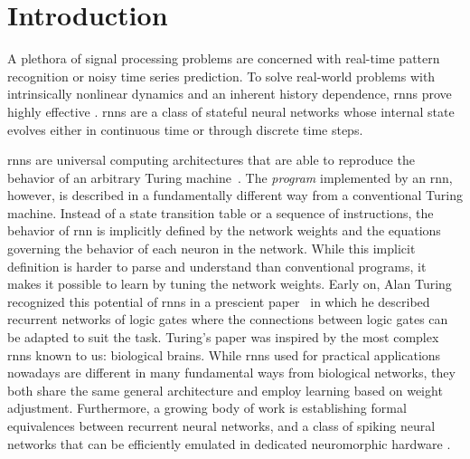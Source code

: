 \documentclass[journal,onecolumn,11pt]{IEEEtran}
\begin{document}
\section{Introduction}
A plethora of signal processing problems are concerned with real-time pattern recognition or noisy time series prediction.
To solve real-world problems with intrinsically nonlinear dynamics and an inherent history dependence, \glspl{rnn} prove highly effective \cite{Goodfellow_etal16_deeplear}. 
\glspl{rnn} are a class of stateful neural networks whose internal state evolves either in continuous time or through discrete time steps.

\glspl{rnn} are universal computing architectures that are able to reproduce the behavior of an arbitrary Turing machine~\cite{Siegelmann_Sontag95}.
The {\it program} implemented by an \gls{rnn}, however, is described in a fundamentally different way from a conventional Turing machine.
Instead of a state transition table or a sequence of instructions, the behavior of \gls{rnn} is implicitly defined by the network weights and the equations governing the behavior of each neuron in the network.
While this implicit definition is harder to parse and understand than conventional programs, it makes it possible to learn by tuning the network weights.
Early on, Alan Turing recognized this potential of \glspl{rnn} in a prescient paper~\cite{Ince92} in which he described recurrent networks of logic gates where the connections between logic gates can be adapted to suit the task.
Turing's paper was inspired by the most complex \glspl{rnn} known to us: biological brains.
While \glspl{rnn} used for practical applications nowadays are different in many fundamental ways from biological networks, they both share the same general architecture and employ learning based on weight adjustment.
Furthermore, a growing body of work is establishing formal equivalences between recurrent neural networks, and a class of spiking neural networks that can be efficiently emulated in dedicated neuromorphic hardware \cite{Zenke_Ganguli17_supesupe,Wozniak_etal18_deepnetw,Neftci18_datapowe,Bellec_etal18_longshor}. 
\end{document}
